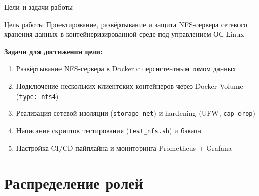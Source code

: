 \documentclass[aspectratio=169,14pt]{beamer}
\begin{document}
	\begin{frame}{Цели и задачи работы}
		\begin{block}{\centering Цель работы}
			\centering\small
			Проектирование, развёртывание и защита NFS-сервера сетевого хранения данных в контейнеризированной среде под управлением ОС Linux
		\end{block}
		\vspace{0.2em}
		\textbf{Задачи для достижения цели:}
		\begin{enumerate}\small
			\item Развёртывание NFS-сервера в Docker с персистентным томом данных
			\item Подключение нескольких клиентских контейнеров через Docker Volume (\texttt{type: nfs4})
			\item Реализация сетевой изоляции (\texttt{storage-net}) и hardening (UFW, \texttt{cap\_drop})
			\item Написание скриптов тестирования (\texttt{test\_nfs.sh}) и бэкапа
			\item Настройка CI/CD пайплайна и мониторинга Prometheus + Grafana
		\end{enumerate}
	\end{frame}
	
	\section{Распределение ролей}
	
\end{document}
